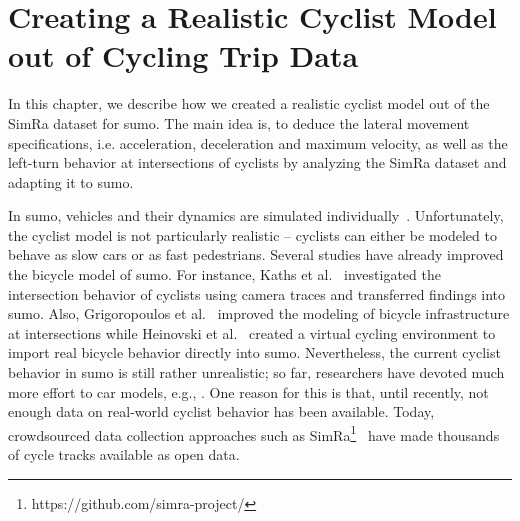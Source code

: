 \chapter{Creating a Realistic Cyclist Model out of Cycling Trip Data}
\label{cha:sumo}
In this chapter, we describe how we created a realistic cyclist model out of the SimRa dataset for \ac{sumo}.
The main idea is, to deduce the lateral movement specifications, i.e. acceleration, deceleration and maximum velocity, as well as the left-turn behavior at intersections of cyclists by analyzing the SimRa dataset and adapting it to \ac{sumo}.

In \ac{sumo}, vehicles and their dynamics are simulated individually~\cite{lopez2018microscopic}.
Unfortunately, the cyclist model is not particularly realistic -- cyclists can either be modeled to behave as slow cars or as fast pedestrians.
Several studies have already improved the bicycle model of \ac{sumo}.
For instance, Kaths et al.~\cite{kaths2016integration} investigated the intersection behavior of cyclists using camera traces and transferred findings into \ac{sumo}.
Also, Grigoropoulos et al.~\cite{grigoropoulos2019modelling} improved the modeling of bicycle infrastructure at intersections while Heinovski et al.~\cite{heinovski2019modeling} created a virtual cycling environment to import real bicycle behavior directly into \ac{sumo}.
Nevertheless, the current cyclist behavior in \ac{sumo} is still rather unrealistic; so far, researchers have devoted much more effort to car models, e.g., \cite{chandler1958traffic,gazis1961nonlinear,gipps1981behavioural, leutzbach1986development,bando1995dynamical,krauss1998microscopic,treiber2000congested,salles2020extending}.
One reason for this is that, until recently, not enough data on real-world cyclist behavior has been available.
Today, crowdsourced data collection approaches such as SimRa\footnote{https://github.com/simra-project/}~\cite{karakaya2020simra} have made thousands of cycle tracks available as open data.

